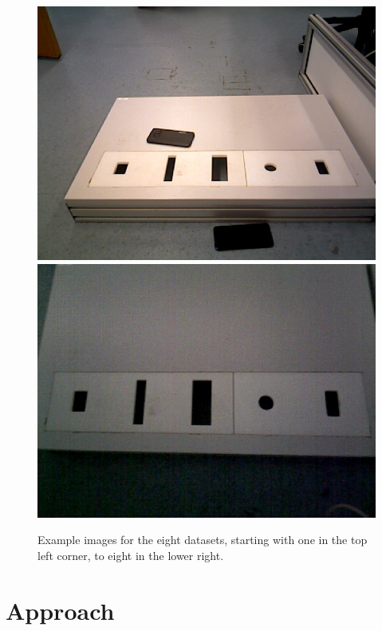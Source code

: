 \documentclass{article}
\begin{document}
\begin{figure}[h!]
\begin{minipage}{\textwidth}
\includegraphics[scale=0.15]{images/Seventh_set.jpg}
\includegraphics[scale=0.15]{images/Eigth_set.jpg}
\caption{Example images for the eight datasets, starting with one in the top left corner, to eight in the lower right.}
\label{fig:datasets}
\end{minipage}
\end{figure}

\section{Approach}
\end{document}
